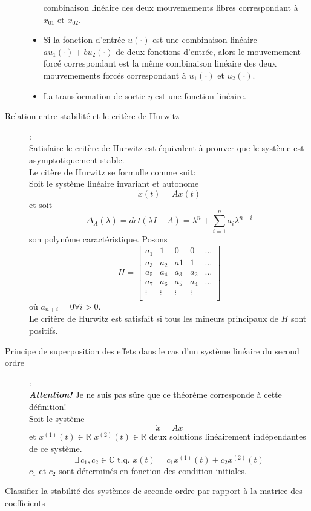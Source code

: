 \documentclass[a4paper]{article}
\begin{document}
\begin{description}
\begin{itemize}
				combinaison linéaire des deux mouvemements libres correspondant à $x_{01}$ et $x_{02}$.
			\item Si la fonction d'entrée $u(\cdot)$ est une combinaison linéaire $au_1(\cdot) + bu_2(\cdot)$ de
				deux fonctions d'entrée, alors le mouvemement forcé correspondant est la même
				combinaison linéaire des deux mouvemements forcés correspondant à $u_1(\cdot)$ et $u_2(\cdot)$.
			\item La transformation de sortie $\eta$ est une fonction linéaire.
		\end{itemize}
	\item [Relation entre stabilité et le critère de Hurwitz]:\\
		Satisfaire le critère de Hurwitz est équivalent à prouver que le système
		est asymptotiquement stable.\\
		Le citère de Hurwitz se formulle comme suit:\\
		Soit le système linéaire invariant et autonome
		\[\dot x(t)=Ax(t)\]
		et soit
		\[\Delta_A(\lambda)=det(\lambda I - A) = \lambda^n+\sum_{i=1}^na_i\lambda^{n-i}\]
		son polynôme caractéristique. Posons
		\[H=\begin{bmatrix}
			a_1 & 1 & 0 & 0 & \dots \\
			a_3 & a_2 & a1 & 1 & \dots \\
			a_5 & a_4 & a_3 & a_2 & \dots \\
			a_7 & a_6 & a_5 & a_4 & \dots \\
			\vdots & \vdots & \vdots & \vdots & \\
		\end{bmatrix}
		\]
		où $a_{n+i} = 0 \forall i > 0$.\\
		Le critère de Hurwitz est satisfait si tous les mineurs principaux de $H$ sont positifs.
	\item [Principe de superposition des effets dans le cas d'un système
linéaire du second ordre]:\\
		\emph{\bf{Attention!}} Je ne suis pas sûre que ce théorème corresponde à cette définition! \\
		Soit le système
		\[\dot x=Ax\]
		et \(x^{(1)}(t)\in\mathbb{R}\) \(x^{(2)}(t)\in\mathbb{R}\)
		deux solutions linéairement indépendantes de ce système.
		\[\exists\,c_1,c_2\in\mathbb{C}\text{ t.q. }x(t)=c_1x^{(1)}(t)+c_2x^{(2)}(t)\]
		\(c_1\) et \(c_2\) sont déterminés en fonction des condition initiales.
	\item [Classifier la stabilité des systèmes de seconde ordre par
rapport à la matrice des coefficients]

\end{description}
\end{document}
